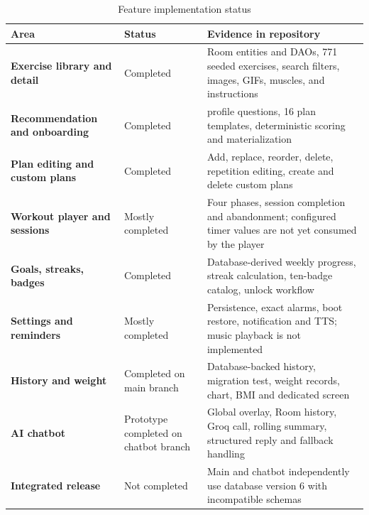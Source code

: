 \begin{table}[ht]
\centering
\caption{Feature implementation status}
\label{tab:feature-status}
\begin{tabularx}{\textwidth}{>{\raggedright\arraybackslash\bfseries}p{} >{\raggedright\arraybackslash}p{} >{\raggedright\arraybackslash}X}
\toprule
Area & Status & Evidence in repository \\
\midrule
Exercise library and detail & Completed & Room entities and DAOs, 771 seeded exercises, search filters, images, GIFs, muscles, and instructions \\
Recommendation and onboarding & Completed & 12 profile questions, 16 plan templates, deterministic scoring and materialization \\
Plan editing and custom plans & Completed & Add, replace, reorder, delete, repetition editing, create and delete custom plans \\
Workout player and sessions & Mostly completed & Four phases, session completion and abandonment; configured timer values are not yet consumed by the player \\
Goals, streaks, badges & Completed & Database-derived weekly progress, streak calculation, ten-badge catalog, unlock workflow \\
Settings and reminders & Mostly completed & Persistence, exact alarms, boot restore, notification and TTS; music playback is not implemented \\
History and weight & Completed on main branch & Database-backed history, migration test, weight records, chart, BMI and dedicated screen \\
AI chatbot & Prototype completed on chatbot branch & Global overlay, Room history, Groq call, rolling summary, structured reply and fallback handling \\
Integrated release & Not completed & Main and chatbot independently use database version 6 with incompatible schemas \\
\bottomrule
\end{tabularx}
\end{table}
